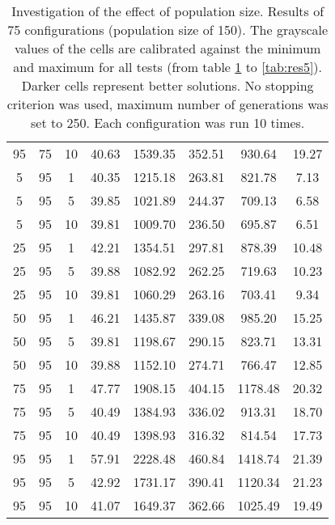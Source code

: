 \begin{table}[h]
\begin{tabular}{ccc|c|c|c|c|c}
95 & 75 & 10 & \cellcolor{gray!42}40.63 & \cellcolor{gray!1}1539.35 & \cellcolor{gray!1}352.51 & \cellcolor{gray!1}930.64 & 19.27\\
5 & 95 & 1 & \cellcolor{gray!45}40.35 & \cellcolor{gray!1}1215.18 & \cellcolor{gray!1}263.81 & \cellcolor{gray!1}821.78 & 7.13\\
5 & 95 & 5 & \cellcolor{gray!50}39.85 & \cellcolor{gray!1}1021.89 & \cellcolor{gray!1}244.37 & \cellcolor{gray!35}709.13 & 6.58\\
5 & 95 & 10 & \cellcolor{gray!50}39.81 & \cellcolor{gray!3}1009.70 & \cellcolor{gray!1}236.50 & \cellcolor{gray!39}695.87 & 6.51\\
25 & 95 & 1 & \cellcolor{gray!26}42.21 & \cellcolor{gray!1}1354.51 & \cellcolor{gray!1}297.81 & \cellcolor{gray!1}878.39 & 10.48\\
25 & 95 & 5 & \cellcolor{gray!50}39.88 & \cellcolor{gray!1}1082.92 & \cellcolor{gray!1}262.25 & \cellcolor{gray!32}719.63 & 10.23\\
25 & 95 & 10 & \cellcolor{gray!50}39.81 & \cellcolor{gray!1}1060.29 & \cellcolor{gray!1}263.16 & \cellcolor{gray!37}703.41 & 9.34\\
50 & 95 & 1 & \cellcolor{gray!1}46.21 & \cellcolor{gray!1}1435.87 & \cellcolor{gray!1}339.08 & \cellcolor{gray!1}985.20 & 15.25\\
50 & 95 & 5 & \cellcolor{gray!50}39.81 & \cellcolor{gray!1}1198.67 & \cellcolor{gray!1}290.15 & \cellcolor{gray!1}823.71 & 13.31\\
50 & 95 & 10 & \cellcolor{gray!50}39.88 & \cellcolor{gray!1}1152.10 & \cellcolor{gray!1}274.71 & \cellcolor{gray!18}766.47 & 12.85\\
75 & 95 & 1 & \cellcolor{gray!1}47.77 & \cellcolor{gray!1}1908.15 & \cellcolor{gray!1}404.15 & \cellcolor{gray!1}1178.48 & 20.32\\
75 & 95 & 5 & \cellcolor{gray!44}40.49 & \cellcolor{gray!1}1384.93 & \cellcolor{gray!1}336.02 & \cellcolor{gray!1}913.31 & 18.70\\
75 & 95 & 10 & \cellcolor{gray!44}40.49 & \cellcolor{gray!1}1398.93 & \cellcolor{gray!1}316.32 & \cellcolor{gray!3}814.54 & 17.73\\
95 & 95 & 1 & \cellcolor{gray!1}57.91 & \cellcolor{gray!1}2228.48 & \cellcolor{gray!1}460.84 & \cellcolor{gray!1}1418.74 & 21.39\\
95 & 95 & 5 & \cellcolor{gray!19}42.92 & \cellcolor{gray!1}1731.17 & \cellcolor{gray!1}390.41 & \cellcolor{gray!1}1120.34 & 21.23\\
95 & 95 & 10 & \cellcolor{gray!38}41.07 & \cellcolor{gray!1}1649.37 & \cellcolor{gray!1}362.66 & \cellcolor{gray!1}1025.49 & 19.49
\end{tabular}
\caption{Investigation of the effect of population size. Results of 75 configurations (population size of 150). The grayscale values of the cells are calibrated against the minimum and maximum for all tests (from table \ref{tab:res1} to \ref{tab:res5}). Darker cells represent better solutions. No stopping criterion was used, maximum number of generations was set to 250. Each configuration was run 10 times.}
\label{tab:res1}
\end{table}

